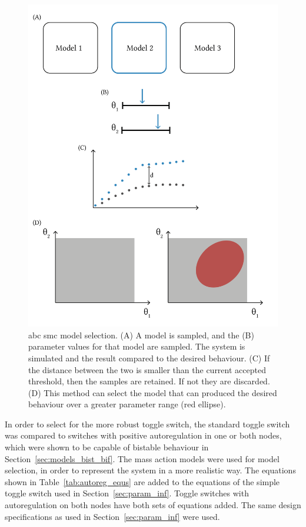 \begin{figure}[htbp]
	\begin{center}
\includegraphics[scale=0.7]{../../chapters/chapterABCSysBio/images/model_selection.png}
\caption[\acrshort{abc} \acrshort{smc} model selection]{\label{fig:abc_model_sel} \acrshort{abc} \acrshort{smc} model selection. (A) A model is sampled, and the (B) parameter values for that model are sampled. The system is simulated and the result compared to the desired behaviour. (C) If the distance between the two is smaller than the current accepted threshold, then the samples are retained. If not they are discarded. (D) This method can select the model that can produced the desired behaviour over a greater parameter range (red ellipse). }
\end{center}
\end{figure}
\clearpage


In order to select for the more robust toggle switch, the standard toggle switch was compared to switches with positive autoregulation in one or both nodes, which were shown to be capable of bistable behaviour in Section~\ref{sec:models_bist_bif}. The mass action models were used for model selection, in order to represent the system in a more realistic way. The equations shown in Table~\ref{tab:autoreg_equs} are added to the equations of the simple toggle switch used in Section~\ref{sec:param_inf}. Toggle switches with autoregulation on both nodes have both sets of equations added. The same design specifications as used in Section~\ref{sec:param_inf} were used.



